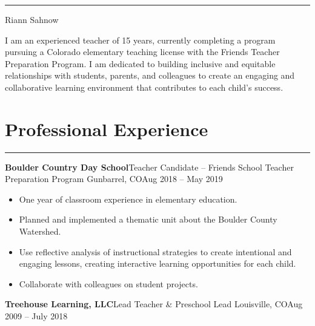 \documentclass[letterpaper,10pt]{article}
\newcommand{\mblue}{\color{darkblue}}
\begin{document}
\pagestyle{empty}

{\mblue\rule{4.63in}{0.08cm}}

\vspace{-1.0pc}
\hfill{\Huge\mblue Riann Sahnow}

\vspace{2pc}
\qquad\qquad I am an experienced teacher of 15 years, currently completing a program pursuing a Colorado elementary teaching license with the Friends Teacher Preparation Program. I am dedicated to
building inclusive and equitable relationships with students, parents, and colleagues to create an engaging and collaborative learning environment that contributes to each child's
success.
\section*{\mblue Professional Experience}

\vspace{-2.15pc}
{\hfill\mblue\rule{4.615in}{0.02cm}}

\vspace{1pc}
\textbf{Boulder Country Day School}\hfill Teacher Candidate -- Friends School Teacher Preparation Program
\smallbreak Gunbarrel, CO\hfill Aug 2018 -- May 2019

\begin{itemize}
    \item One year of classroom experience in elementary education.
    \item Planned and implemented a thematic unit about the Boulder County Watershed.
    \item Use reflective analysis of instructional strategies to create intentional and engaging lessons, creating interactive learning opportunities for each child.
    \item Collaborate with colleagues on student projects.
\end{itemize}


\vspace{1pc}
\textbf{Treehouse Learning, LLC}\hfill Lead Teacher \& Preschool Lead
\smallbreak Louisville, CO\hfill Aug 2009 -- July 2018
\end{document}

